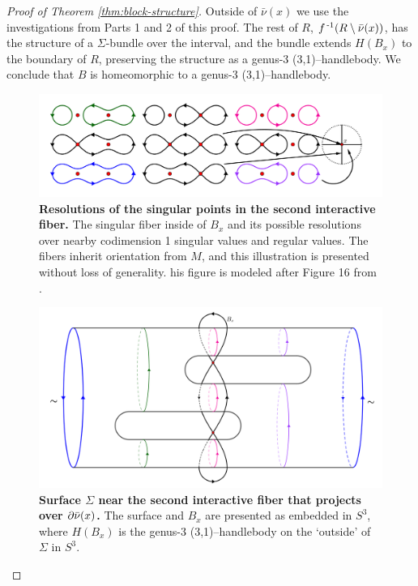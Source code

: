 \begin{proof}[Proof of Theorem \ref{thm:block-structure}]
	Outside of $\bar\nu(x)$ we use the investigations from Parts 1 and 2 of this proof. The rest of $R$, $f^{\,\text{-}1}(R\setminus\bar\nu(x))$, has the structure of a $\Sigma$-bundle over the interval, and the bundle extends $H(B_x)$ to the boundary of $R$, preserving the structure as a genus-3 (3,1)--handlebody.
	We conclude that $B$ is homeomorphic to a genus-3 (3,1)--handlebody.
	
		\begin{figure}[h]
		\centering
		\includegraphics[width=\textwidth]{figures/codim-2-interactive-fiber-2.png}
		\caption{
			\textbf{Resolutions of the singular points in the second interactive fiber.}
			The singular fiber inside of $B_x$ and its possible resolutions over nearby codimension 1 singular values and regular values.
			The fibers inherit orientation from $M$, and this illustration is presented without loss of generality.
			his figure is modeled after Figure 16 from \cite{CostThur08}.
		}
		\label{fig:codim-2-interactive-fiber-2}
	\end{figure}
	
	\begin{figure}[h]
		\centering
		\includegraphics[width=\textwidth]{figures/codim-2-surface-2.png}
		\caption{
			\textbf{Surface $\Sigma$ near the second interactive fiber that projects over $\partial\bar\nu(x)$.}
			The surface and $B_x$ are presented as embedded in $S^3$, where $H(B_x)$ is the genus-3 (3,1)--handlebody on the `outside' of $\Sigma$ in $S^3$.
		}
		\label{fig:codim-2-surface-2}
	\end{figure}


\end{proof}

